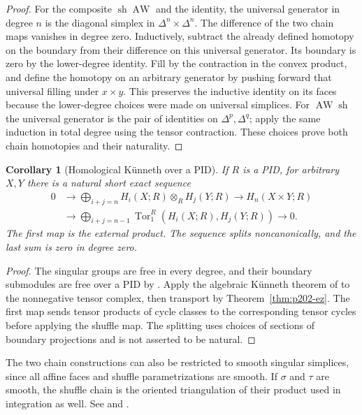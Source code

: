 \documentclass[11pt,oneside,openany]{book}
\theoremstyle{plain}
\newtheorem{corollary}[theorem]{Corollary}
\theoremstyle{definition}
\theoremstyle{remark}
\begin{document}
\begin{proof}
For the composite \(\operatorname{sh}\operatorname{AW}\) and
the identity, the universal generator in degree \(n\) is the
diagonal simplex in \(\Delta^n\times\Delta^n\). The difference
of the two chain maps vanishes in degree zero. Inductively,
subtract the already defined homotopy on the boundary from
their difference on this universal generator. Its boundary
is zero by the lower-degree identity. Fill by the contraction
in the convex product, and define the homotopy on an arbitrary
generator by pushing forward that universal filling under
\(x\times y\). This preserves the inductive identity on its
faces because the lower-degree choices were made on universal
simplices. For \(\operatorname{AW}\operatorname{sh}\) the
universal generator is the pair of identities on
\(\Delta^p,\Delta^q\); apply the same induction in total
degree using the tensor contraction. These choices prove
both chain homotopies and their naturality.
\end{proof}

\begin{corollary}[Homological K\"unneth over a PID]\label{cor:p202-topological-kunneth}
If \(R\) is a PID, for arbitrary \(X,Y\) there is a natural
short exact sequence
\[
 \begin{split}
 0&\longrightarrow \bigoplus_{i+j=n}H_i(X;R)\otimes_R H_j(Y;R)
 \longrightarrow H_n(X\times Y;R)\\
 &\longrightarrow \bigoplus_{i+j=n-1}
   \operatorname{Tor}_1^R(H_i(X;R),H_j(Y;R))
 \longrightarrow0 .
 \end{split}
\]
The first map is the external product. The sequence splits
noncanonically, and the last sum is zero in degree zero.
\end{corollary}
\begin{proof}
The singular groups are free in every degree, and their
boundary submodules are free over a PID by \cite[Lemma 11.7]{P103}.
Apply the algebraic K\"unneth theorem of \cite[Chapter 11]{P103}
to the nonnegative tensor complex,
then transport by Theorem~\ref{thm:p202-ez}. The first map
sends tensor products of cycle classes to the corresponding
tensor cycles before applying the shuffle map. The splitting
uses choices of sections of boundary projections and is
not asserted to be natural.
\end{proof}

The two chain constructions can also be restricted to smooth
singular simplices, since all affine faces and shuffle
parametrizations are smooth. If \(\sigma\) and \(\tau\) are
smooth, the shuffle chain is the oriented triangulation
of their product used in integration as well.
See \cite[Sections 3.2 and 3.B]{Hatcher} and
\cite[Sections 7.7--7.11]{MKP}.
\end{document}
